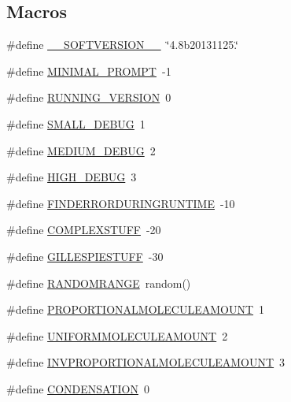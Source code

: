 \subsection*{Macros}
\begin{DoxyCompactItemize}
\item 
\#define \hyperlink{a00050_aab38659c2fe462437b89a1e85e619dc7}{\-\_\-\-\_\-\-S\-O\-F\-T\-V\-E\-R\-S\-I\-O\-N\-\_\-\-\_\-}~\char`\"{}4.\-8b20131125.\char`\"{}
\item 
\#define \hyperlink{a00050_a972f6696f10f8159f336357f003493b6}{M\-I\-N\-I\-M\-A\-L\-\_\-\-P\-R\-O\-M\-P\-T}~-\/1
\item 
\#define \hyperlink{a00050_a72244054b9e2e45fe85cbef84bd42904}{R\-U\-N\-N\-I\-N\-G\-\_\-\-V\-E\-R\-S\-I\-O\-N}~0
\item 
\#define \hyperlink{a00050_a6f7711b8195edb3c3541c153ebcb4bfa}{S\-M\-A\-L\-L\-\_\-\-D\-E\-B\-U\-G}~1
\item 
\#define \hyperlink{a00050_ab0ead5a0a8c59ad5f4d9fcf0be28a5d7}{M\-E\-D\-I\-U\-M\-\_\-\-D\-E\-B\-U\-G}~2
\item 
\#define \hyperlink{a00050_ac2a71f467524d5299cbff5df96be638a}{H\-I\-G\-H\-\_\-\-D\-E\-B\-U\-G}~3
\item 
\#define \hyperlink{a00050_a0934dca9b46dc1ce8ccae606a6511f63}{F\-I\-N\-D\-E\-R\-R\-O\-R\-D\-U\-R\-I\-N\-G\-R\-U\-N\-T\-I\-M\-E}~-\/10
\item 
\#define \hyperlink{a00050_a186bfb39322832c790ce5403bc04330d}{C\-O\-M\-P\-L\-E\-X\-S\-T\-U\-F\-F}~-\/20
\item 
\#define \hyperlink{a00050_a27f5d30679c0e8877ba9246eb1a48ff4}{G\-I\-L\-L\-E\-S\-P\-I\-E\-S\-T\-U\-F\-F}~-\/30
\item 
\#define \hyperlink{a00050_a4cb4f6978b0d938a0523bd6946e7609d}{R\-A\-N\-D\-O\-M\-R\-A\-N\-G\-E}~random()
\item 
\#define \hyperlink{a00050_a79c4b6317fd327fd5a62d65036481a25}{P\-R\-O\-P\-O\-R\-T\-I\-O\-N\-A\-L\-M\-O\-L\-E\-C\-U\-L\-E\-A\-M\-O\-U\-N\-T}~1
\item 
\#define \hyperlink{a00050_a6236cb136896f6bcbc6694d394e8aca3}{U\-N\-I\-F\-O\-R\-M\-M\-O\-L\-E\-C\-U\-L\-E\-A\-M\-O\-U\-N\-T}~2
\item 
\#define \hyperlink{a00050_ae36555e0be87892071c6340cc0fa43ad}{I\-N\-V\-P\-R\-O\-P\-O\-R\-T\-I\-O\-N\-A\-L\-M\-O\-L\-E\-C\-U\-L\-E\-A\-M\-O\-U\-N\-T}~3
\item 
\#define \hyperlink{a00050_aeeaf3e004dff03f70f94e0cf7d623b3c}{C\-O\-N\-D\-E\-N\-S\-A\-T\-I\-O\-N}~0
\item 

\end{DoxyCompactItemize}
